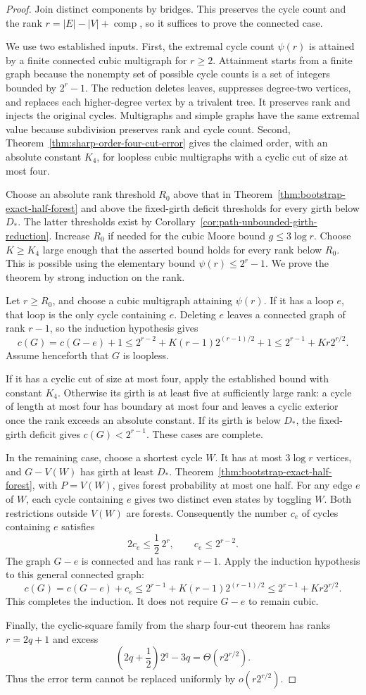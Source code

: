 \begin{proof}
Join distinct components by bridges.
This preserves the cycle count and the rank $r=|E|-|V|+\operatorname{comp}$, so it suffices to prove the connected case.

We use two established inputs.
First, the extremal cycle count $\psi(r)$ is attained by a finite connected cubic multigraph for $r\ge2$.
Attainment starts from a finite graph because the nonempty set of possible cycle counts is a set of integers bounded by $2^r-1$.
The reduction deletes leaves, suppresses degree-two vertices, and replaces each higher-degree vertex by a trivalent tree.
It preserves rank and injects the original cycles.
Multigraphs and simple graphs have the same extremal value because subdivision preserves rank and cycle count.
Second, Theorem~\ref{thm:sharp-order-four-cut-error} gives the claimed order, with an absolute constant $K_4$, for loopless cubic multigraphs with a cyclic cut of size at most four.

Choose an absolute rank threshold $R_0$ above that in
Theorem~\ref{thm:bootstrap-exact-half-forest} and above the fixed-girth deficit thresholds for every girth below $D_*$.
The latter thresholds exist by Corollary~\ref{cor:path-unbounded-girth-reduction}.
Increase $R_0$ if needed for the cubic Moore bound $g\le3\log r$.
Choose $K\ge K_4$ large enough that the asserted bound holds for every rank below $R_0$.
This is possible using the elementary bound $\psi(r)\le2^r-1$.
We prove the theorem by strong induction on the rank.

Let $r\ge R_0$, and choose a cubic multigraph attaining $\psi(r)$.
If it has a loop $e$, that loop is the only cycle containing $e$.
Deleting $e$ leaves a connected graph of rank $r-1$, so the induction hypothesis gives
\[
 c(G)=c(G-e)+1
 \le2^{r-2}+K(r-1)2^{(r-1)/2}+1
 \le2^{r-1}+Kr2^{r/2}.
\]
Assume henceforth that $G$ is loopless.

If it has a cyclic cut of size at most four, apply the established bound with constant $K_4$.
Otherwise its girth is at least five at sufficiently large rank:
a cycle of length at most four has boundary at most four and leaves a cyclic exterior once the rank exceeds an absolute constant.
If its girth is below $D_*$, the fixed-girth deficit gives
$c(G)<2^{r-1}$.
These cases are complete.

In the remaining case, choose a shortest cycle $W$.
It has at most $3\log r$ vertices, and $G-V(W)$ has girth at least $D_*$.
Theorem~\ref{thm:bootstrap-exact-half-forest}, with $P=V(W)$, gives forest probability at most one half.
For any edge $e$ of $W$, each cycle containing $e$ gives two distinct even states by toggling $W$.
Both restrictions outside $V(W)$ are forests.
Consequently the number $c_e$ of cycles containing $e$ satisfies
\[
 2c_e\le\frac12\,2^r,
 \qquad c_e\le2^{r-2}.
\]
The graph $G-e$ is connected and has rank $r-1$.
Apply the induction hypothesis to this general connected graph:
\[
 c(G)=c(G-e)+c_e
 \le2^{r-1}+K(r-1)2^{(r-1)/2}
 \le2^{r-1}+Kr2^{r/2}.
\]
This completes the induction.
It does not require $G-e$ to remain cubic.

Finally, the cyclic-square family from the sharp four-cut theorem has ranks $r=2q+1$ and excess
\[
 \left(2q+\frac12\right)2^q-3q
 =\Theta(r2^{r/2}).
\]
Thus the error term cannot be replaced uniformly by $o(r2^{r/2})$.
\end{proof}
